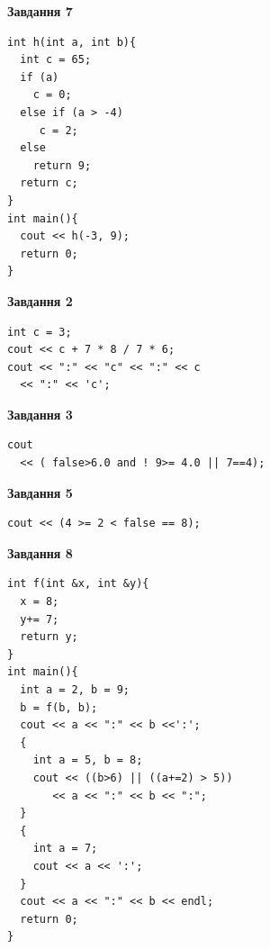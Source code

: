 \documentclass[12pt, ukrainian]{article}
\begin{document}
{\begin {large}
\begin{minipage}[t]{7.0cm}
\begin{center}
\textbf{Завдання 7}
\end{center}
\vspace{-8mm}

\begin{verbatim}
int h(int a, int b){
  int c = 65;
  if (a)
    c = 0;
  else if (a > -4)
     c = 2;
  else
    return 9;
  return c;
}
int main(){
  cout << h(-3, 9);
  return 0;
}
\end{verbatim}

\end{minipage}
\vline \hspace{1mm}
\begin{minipage}[t]{11.0cm}

\begin{center}
\textbf{Завдання 2}
\end{center}
\vspace{-8mm}

\begin{verbatim}
int c = 3;
cout << c + 7 * 8 / 7 * 6;
cout << ":" << "c" << ":" << c 
  << ":" << 'c';
\end{verbatim}



\begin{center}
\textbf{Завдання 3}
\end{center}
\vspace{-8mm}

\begin{verbatim}
cout 
  << ( false>6.0 and ! 9>= 4.0 || 7==4);
\end{verbatim}



\begin{center}
\textbf{Завдання 5}
\end{center}
\vspace{-8mm}

\begin{verbatim}
cout << (4 >= 2 < false == 8);
\end{verbatim}



\begin{center}
\textbf{Завдання 8}
\end{center}
\vspace{-8mm}

\begin{verbatim}
int f(int &x, int &y){
  x = 8;
  y+= 7;
  return y;
}
int main(){
  int a = 2, b = 9;
  b = f(b, b);
  cout << a << ":" << b <<':';
  {
    int a = 5, b = 8;
    cout << ((b>6) || ((a+=2) > 5))
       << a << ":" << b << ":";
  }
  {
    int a = 7;
    cout << a << ':';
  }
  cout << a << ":" << b << endl;
  return 0;
}
\end{verbatim}


\end{minipage}
\end{large}}
\end{document}
